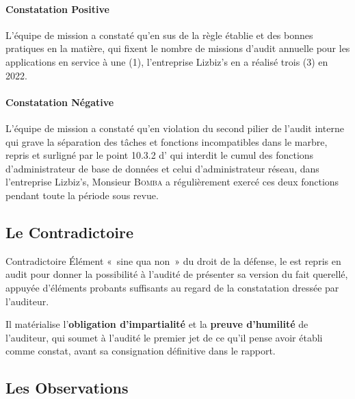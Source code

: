 \paragraph{Constatation Positive}
L'équipe de mission a constaté qu'en sus de la règle établie et des bonnes pratiques
en la matière, qui fixent le nombre de missions d'audit annuelle pour les applications
en service à une (1), l'entreprise Lizbiz's en a réalisé trois (3) en 2022.

\paragraph{Constatation Négative}
L'équipe de mission a constaté qu'en violation du second pilier de l'audit interne qui
grave la séparation des tâches et fonctions incompatibles dans le marbre, repris et
surligné par le point 10.3.2 d' qui interdit le cumul des fonctions
d'administrateur de base de données et celui d'administrateur réseau, dans l'entreprise
Lizbiz's, Monsieur \textsc{Bomba} a régulièrement exercé ces deux fonctions pendant
toute la période sous revue.

\subsection{Le Contradictoire}

\begin{boxdef}{Contradictoire}
Élément «~sine qua non~» du droit de la défense, le 
est repris en audit pour donner la possibilité à l'audité de présenter sa version du
fait querellé, appuyée d'éléments probants suffisants au regard de la constatation
dressée par l'auditeur.

Il matérialise l'\textbf{obligation d'impartialité} et la \textbf{preuve d'humilité}
de l'auditeur, qui soumet à l'audité le premier jet de ce qu'il pense avoir établi comme
constat, avant sa consignation définitive dans le rapport.
\end{boxdef}

\subsection{Les Observations}

